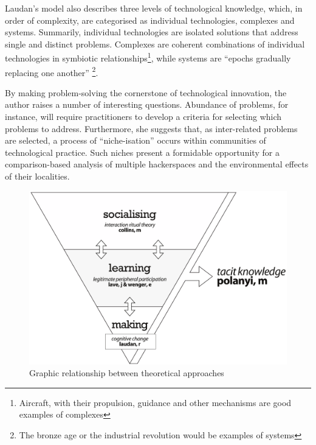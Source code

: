 Laudan's model also describes three levels of technological knowledge, which, in order of complexity, are categorised as individual technologies, complexes and systems. Summarily, individual technologies are isolated solutions that address single and distinct problems. Complexes are coherent combinations of individual technologies in symbiotic relationships\footnote{Aircraft, with their propulsion, guidance and other mechanisms are good examples of complexes}, while systems are ``epochs gradually replacing one another'' \citep[p.92]{laudan84}\footnote{The bronze age or the industrial revolution would be examples of systems}. 

By making problem-solving the cornerstone of technological innovation, the author raises a number of interesting questions. Abundance of problems, for instance, will require practitioners to develop a criteria for selecting which problems to address. Furthermore, she suggests that, as inter-related problems are selected, a process of ``niche-isation'' occurs within communities of technological practice. Such niches present a formi\-dable opportunity for a comparison-based analysis of multiple hackerspa\-ces and the environmental effects of their localities.

\begin{figure}[ht]
	\centering
		\includegraphics[scale=0.45,natwidth=10pt,natheight=1pt]{confirmation-report/graphs/pyramid01.pdf}
	\caption[Theoretical Relations]{Graphic relationship between theoretical approaches}
	\label{pyramid}
\end{figure}


